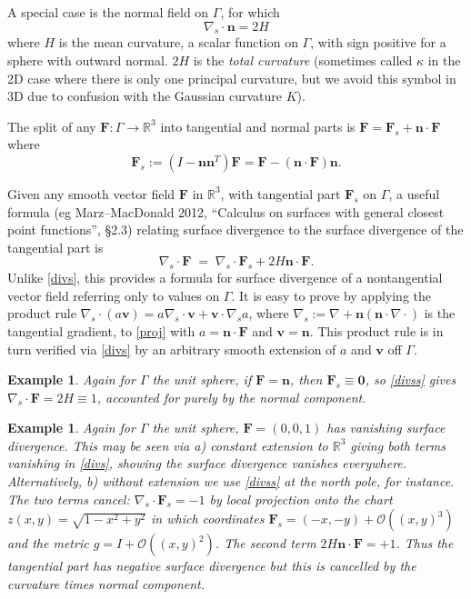 \documentclass[11pt]{article}
\newcommand{\be}{\begin{equation}}
\newcommand{\ee}{\end{equation}}
\newcommand{\mbf}[1]{{\mathbf #1}}
\newcommand{\bigO}{{\mathcal O}}
\newcommand{\R}{\mathbb{R}}
\newtheorem{exa}[thm]{Example}
\newcommand{\n}{\mbf{n}}
\newcommand{\vv}{\mbf{v}}
\begin{document}
A special case is the normal field on $\Gamma$, for which
\be
\nabla_s\cdot \n = 2H
\label{divsn}
\ee
where $H$ is the mean curvature, a scalar function on $\Gamma$,
with sign positive for a sphere with
outward normal. $2H$ is the {\em total curvature} (sometimes called
$\kappa$ in the 2D case where there is only one principal curvature,
but we avoid this symbol in 3D due to confusion with the Gaussian curvature $K$).

The split of any $\mbf{F}:\Gamma \to \R^3$ into tangential and normal
parts is $\mbf{F} = \mbf{F}_s + \n\cdot\mbf{F}$ where
\be
\mbf{F}_s := (I-\n\n^T)\mbf{F} = \mbf{F} - (\n\cdot\mbf{F})\n
.
\label{proj}
\ee

Given any smooth vector field $\mbf{F}$ in $\R^3$, with tangential part
$\mbf{F}_s$ on $\Gamma$,
a useful formula (eg Marz--MacDonald 2012, ``Calculus on surfaces with general closest point functions'', \S2.3)
relating surface divergence to the surface divergence of the tangential part is
\be
\nabla_s \cdot \mbf{F}
\;=\;
\nabla_s \cdot \mbf{F}_s + 2H \n\cdot \mbf{F}
.
\label{divss}
\ee
Unlike \eqref{divs}, this provides a formula for surface divergence of
a nontangential vector field referring only to values on $\Gamma$.
It is easy to prove by applying the product rule
$\nabla_s\cdot(a\vv) = a \nabla_s\cdot\vv + \vv \cdot \nabla_s a$,
where $\nabla_s := \nabla + \n (\n \cdot \nabla \cdot)$ is the tangential
gradient, to \eqref{proj} with $a = \n\cdot\mbf{F}$ and $\vv=\n$.
This product rule is in turn verified via \eqref{divs} by
an arbitrary smooth extension of $a$ and $\vv$ off $\Gamma$.

\begin{exa}
  Again for $\Gamma$ the unit sphere, if $\mbf{F}=\n$, then $\mbf{F}_s\equiv\mbf{0}$,
  so \eqref{divss} gives $\nabla_s\cdot\mbf{F} = 2H \equiv 1$, accounted
  for purely by the normal component.
\end{exa}
\begin{exa}
  Again for $\Gamma$ the unit sphere,
  $\mbf{F}=(0,0,1)$ has vanishing surface divergence. 
  This may be seen via a) constant extension to $\R^3$ giving
  both terms vanishing in \eqref{divs}, showing the surface divergence
  vanishes everywhere.
  Alternatively, b) without extension
  we use \eqref{divss} at the north pole, for instance.
  The two terms cancel: $\nabla_s\cdot \mbf{F}_s = -1$
  by local projection onto the chart $z(x,y) = \sqrt{1-x^2+y^2}$
  in which coordinates $\mbf{F}_s = (-x,-y) + \bigO((x,y)^3)$ and
  the metric $g = I + \bigO((x,y)^2)$.
  The second term $2H\n\cdot\mbf{F} = +1$.
  Thus the tangential part has negative surface divergence but this
  is cancelled by the curvature times normal component.
  \end{exa}
\end{document}
